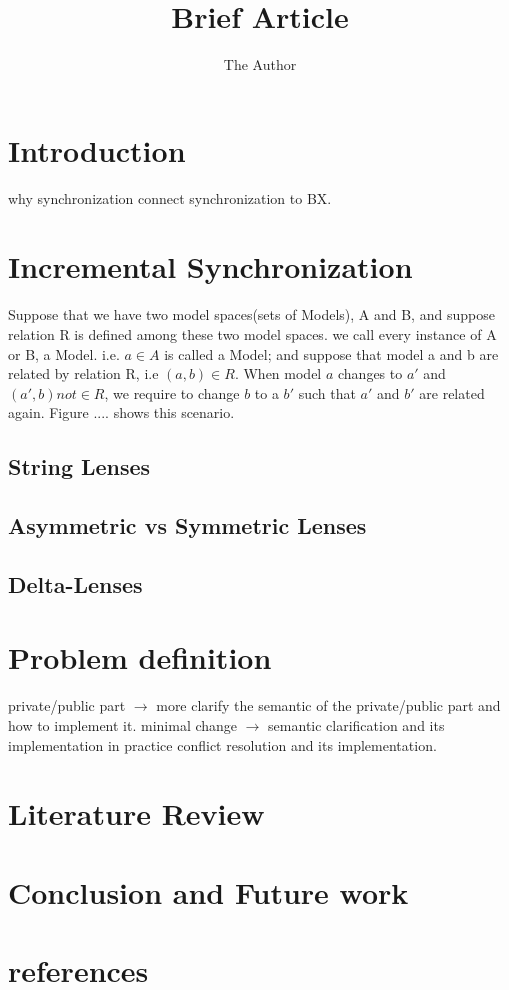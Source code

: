 \documentclass[11pt, oneside]{article}   	%
\title{Brief Article}
\author{The Author}
\begin{document}
\maketitle


\section {Introduction}
why synchronization
connect synchronization to BX.


\section {Incremental Synchronization}
Suppose that we have two model spaces(sets of Models), A and B, and suppose relation R is defined among these two model spaces. we call every instance of A or B, a Model. i.e. $a \in A$ is called a Model; and suppose that model a and b are related by relation R, i.e $(a,b) \in R$. When model $a$ changes to $a'$ and $(a',b) not \in R$, we require to change $b$ to a $b'$ such that $a'$ and $b'$ are related again. Figure ....  shows this scenario.




\subsection{String Lenses}

\subsection{Asymmetric vs Symmetric Lenses}

\subsection{Delta-Lenses}

\section {Problem definition}
private/public part $\rightarrow$ more clarify the semantic of the private/public part and how to implement it.
minimal change $\rightarrow$ semantic clarification and its implementation in practice
conflict resolution and its implementation.

\section{Literature Review} 


\section{Conclusion and Future work}\label{sec:conclusion}

\section{references}
\end{document}
